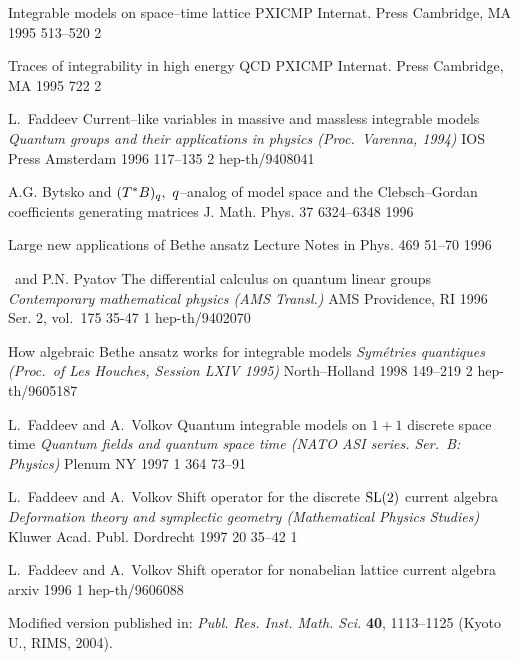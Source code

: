 {
{\LF}
{Integrable models on space--time lattice}
{PXICMP} {Internat. Press} {Cambridge, MA} {1995} {} {513--520} {2}

{\LF}
{Traces of integrability in high energy QCD}
{PXICMP} {Internat. Press} {Cambridge, MA} {1995} {} {722} {2}

{L.~Faddeev}
{Current--like variables in massive and massless integrable models} 
{\em Quantum groups and their applications in physics
(Proc.\ Varenna, 1994)}
{IOS Press} {Amsterdam} {1996} {} {117--135} {2}
{hep-th/9408041}

{A.G. Bytsko and \LF}
{$(T\sp *{B})\sb q,\ q$--analog of model space and the
  Clebsch--Gordan coefficients generating matrices}
{J. Math. Phys.} {37} {} {6324--6348} {1996}

{\LF}
{Large new applications of {B}ethe ansatz}
{Lecture Notes in Phys.} {469} {} {51--70} {1996}

{\LF\ and P.N. Pyatov}
{The differential calculus on quantum linear groups}
{\em Contemporary mathematical physics (AMS Transl.)} 
{AMS} {Providence, RI} {1996} {Ser. 2, vol.~175} {35-47} {1}
{hep-th/9402070}

{\LF} 
{How algebraic Bethe ansatz works for integrable models} 
{\em Sym\'etries quantiques (Proc.\ of Les Houches, Session LXIV 1995)}
{North--Holland} {} {1998} {} {149--219} {2}
{hep-th/9605187}

{L.~Faddeev and A.~Volkov} 
{Quantum integrable models on $1+1$ discrete space time} 
{\em Quantum fields and quantum space time %
(NATO ASI series. Ser.~B: Physics)} {Plenum} {NY} {1997} {1}
{364} {73--91} {}

{L.~Faddeev and A.~Volkov}
{Shift operator for the discrete ${\rm SL}(2)$ current algebra}
{\em Deformation theory and symplectic geometry %
 (Mathematical Physics Studies)}
{Kluwer Acad. Publ.} {Dordrecht} {1997} {20} {35--42} {1} {}

{L.~Faddeev and A.~Volkov} 
{Shift operator for nonabelian lattice current algebra}
{arxiv} {} {} {1996} {} {} {1} {hep-th/9606088}

\bibitem{1997dd}
Modified version published in:
{\em Publ. Res. Inst. Math. Sci.} {\bf 40}, %
{1113--1125} (Kyoto U., RIMS, 2004).

}
